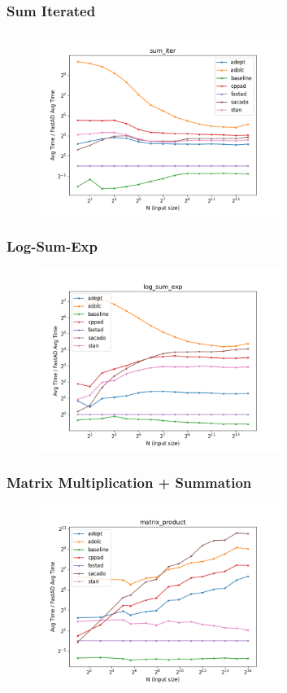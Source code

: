 \begin{frame}
\frametitle{Sum Iterated}

\begin{figure}
    \includegraphics[width=0.7\textwidth]{../../figs/sum_iter_fig.png}
\end{figure}
    
\end{frame}

\begin{frame}
\frametitle{Log-Sum-Exp}
\begin{figure}
    \includegraphics[width=0.7\textwidth]{../../figs/log_sum_exp_fig.png}
\end{figure}
\end{frame}

\begin{frame}
\frametitle{Matrix Multiplication + Summation}
\begin{figure}
    \includegraphics[width=0.7\textwidth]{../../figs/matrix_product_fig.png}
\end{figure}
\end{frame}

